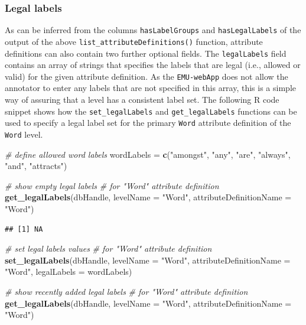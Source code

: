 \documentclass[]{book}
\newenvironment{Shaded}{\begin{snugshade}}{\end{snugshade}}
\newcommand{\CommentTok}[1]{\textcolor[rgb]{0.56,0.35,0.01}{\textit{#1}}}
\newcommand{\DataTypeTok}[1]{\textcolor[rgb]{0.13,0.29,0.53}{#1}}
\newcommand{\KeywordTok}[1]{\textcolor[rgb]{0.13,0.29,0.53}{\textbf{#1}}}
\newcommand{\NormalTok}[1]{#1}
\newcommand{\StringTok}[1]{\textcolor[rgb]{0.31,0.60,0.02}{#1}}
\theoremstyle{definition}
\theoremstyle{definition}
\theoremstyle{definition}
\theoremstyle{remark}
\begin{document}
\hypertarget{subsubsec:emuDBlegalLabels}{%
\subsubsection{Legal labels}\label{subsubsec:emuDBlegalLabels}}

As can be inferred from the columns \texttt{hasLabelGroups} and
\texttt{hasLegalLabels} of the output of the above
\texttt{list\_attributeDefinitions()} function, attribute definitions
can also contain two further optional fields. The \texttt{legalLabels}
field contains an array of strings that specifies the labels that are
legal (i.e., allowed or valid) for the given attribute definition. As
the \texttt{EMU-webApp} does not allow the annotator to enter any labels
that are not specified in this array, this is a simple way of assuring
that a level has a consistent label set. The following R code snippet
shows how the \texttt{set\_legalLabels} and \texttt{get\_legalLabels}
functions can be used to specify a legal label set for the primary
\texttt{Word} attribute definition of the \texttt{Word} level.

\begin{Shaded}
\begin{Highlighting}[]
\CommentTok{# define allowed word labels}
\NormalTok{wordLabels =}\StringTok{ }\KeywordTok{c}\NormalTok{(}\StringTok{"amongst"}\NormalTok{, }\StringTok{"any"}\NormalTok{, }\StringTok{"are"}\NormalTok{,}
               \StringTok{"always"}\NormalTok{, }\StringTok{"and"}\NormalTok{, }\StringTok{"attracts"}\NormalTok{)}

\CommentTok{# show empty legal labels}
\CommentTok{# for "Word" attribute definition}
\KeywordTok{get_legalLabels}\NormalTok{(dbHandle,}
                \DataTypeTok{levelName =} \StringTok{"Word"}\NormalTok{,}
                \DataTypeTok{attributeDefinitionName =} \StringTok{"Word"}\NormalTok{)}
\end{Highlighting}
\end{Shaded}

\begin{verbatim}
## [1] NA
\end{verbatim}

\begin{Shaded}
\begin{Highlighting}[]
\CommentTok{# set legal labels values}
\CommentTok{# for "Word" attribute definition}
\KeywordTok{set_legalLabels}\NormalTok{(dbHandle,}
                \DataTypeTok{levelName =} \StringTok{"Word"}\NormalTok{,}
                \DataTypeTok{attributeDefinitionName =} \StringTok{"Word"}\NormalTok{,}
                \DataTypeTok{legalLabels =}\NormalTok{ wordLabels)}

\CommentTok{# show recently added legal labels}
\CommentTok{# for "Word" attribute definition}
\KeywordTok{get_legalLabels}\NormalTok{(dbHandle,}
                \DataTypeTok{levelName =} \StringTok{"Word"}\NormalTok{,}
                \DataTypeTok{attributeDefinitionName =} \StringTok{"Word"}\NormalTok{)}
\end{Highlighting}
\end{Shaded}
\end{document}

